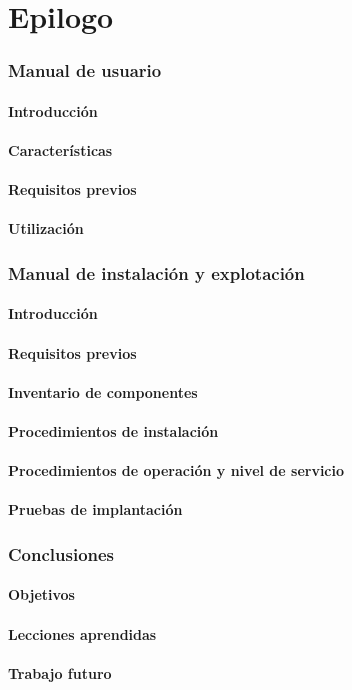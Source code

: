 \part{Epilogo}
\section{Manual de usuario}
\subsection{Introducción}
\subsection{Características}
\subsection{Requisitos previos}
\subsection{Utilización}
\section{Manual de instalación y explotación}
\subsection{Introducción}
\subsection{Requisitos previos}
\subsection{Inventario de componentes}
\subsection{Procedimientos de instalación}
\subsection{Procedimientos de operación y nivel de servicio}
\subsection{Pruebas de implantación}
\section{Conclusiones}
\subsection{Objetivos}
\subsection{Lecciones aprendidas}
\subsection{Trabajo futuro}